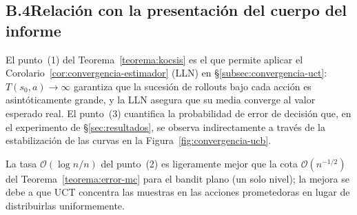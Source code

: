 \subsection*{B.4\quad Relación con la presentación del cuerpo del informe}

El punto~(1) del Teorema~\ref{teorema:kocsis} es el que permite aplicar el Corolario~\ref{cor:convergencia-estimador} (LLN) en §\ref{subsec:convergencia-uct}: $T(s_0, a) \to \infty$ garantiza que la sucesión de rollouts bajo cada acción es asintóticamente grande, y la LLN asegura que su media converge al valor esperado real. El punto~(3) cuantifica la probabilidad de error de decisión que, en el experimento de §\ref{sec:resultados}, se observa indirectamente a través de la estabilización de las curvas en la Figura~\ref{fig:convergencia-ucb}.

La tasa $\mathcal{O}(\log n / n)$ del punto~(2) es ligeramente mejor que la cota $\mathcal{O}(n^{-1/2})$ del Teorema~\ref{teorema:error-mc} para el bandit plano (un solo nivel); la mejora se debe a que UCT concentra las muestras en las acciones prometedoras en lugar de distribuirlas uniformemente.
